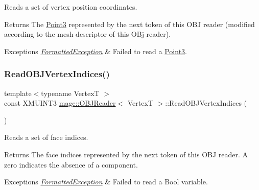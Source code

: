 Reads a set of vertex position coordinates.

\begin{DoxyReturn}{Returns}
The {\ttfamily \hyperlink{structmage_1_1_point3}{Point3}} represented by the next token of this O\+BJ reader (modified according to the mesh descriptor of this O\+Bj reader). 
\end{DoxyReturn}

\begin{DoxyExceptions}{Exceptions}
{\em \hyperlink{classmage_1_1_formatted_exception}{Formatted\+Exception}} & Failed to read a {\ttfamily \hyperlink{structmage_1_1_point3}{Point3}}. \\
\hline
\end{DoxyExceptions}
\hypertarget{classmage_1_1_o_b_j_reader_a2e807f8c18874135888d1e99d4d08d90}{}\label{classmage_1_1_o_b_j_reader_a2e807f8c18874135888d1e99d4d08d90} 
\subsubsection{\texorpdfstring{Read\+O\+B\+J\+Vertex\+Indices()}{ReadOBJVertexIndices()}}
{\footnotesize\ttfamily template$<$typename VertexT $>$ \\
const X\+M\+U\+I\+N\+T3 \hyperlink{classmage_1_1_o_b_j_reader}{mage\+::\+O\+B\+J\+Reader}$<$ VertexT $>$\+::Read\+O\+B\+J\+Vertex\+Indices (\begin{DoxyParamCaption}{ }\end{DoxyParamCaption})\hspace{0.3cm}{\ttfamily [private]}}

Reads a set of face indices.

\begin{DoxyReturn}{Returns}
The face indices represented by the next token of this O\+BJ reader. A zero indicates the absence of a component. 
\end{DoxyReturn}

\begin{DoxyExceptions}{Exceptions}
{\em \hyperlink{classmage_1_1_formatted_exception}{Formatted\+Exception}} & Failed to read a Bool variable. \\
\hline
\end{DoxyExceptions}
\hypertarget{classmage_1_1_o_b_j_reader_aa9ef2ced0ad787b13818722c7dfa0636}{}\label{classmage_1_1_o_b_j_reader_aa9ef2ced0ad787b13818722c7dfa0636} 
